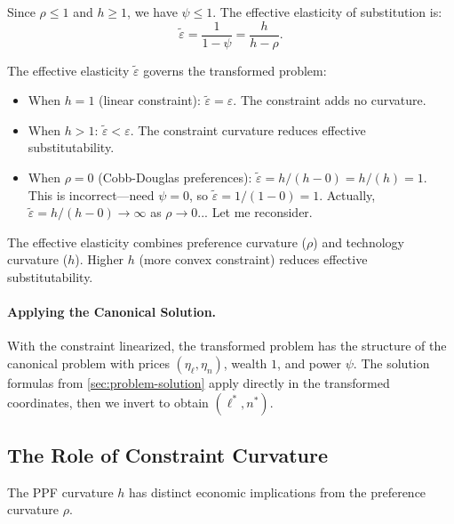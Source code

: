 Since $\rho \leq 1$ and $h \geq 1$, we have $\psi \leq 1$. The effective elasticity of substitution is:
\begin{equation}
\tilde{\varepsilon} = \frac{1}{1 - \psi} = \frac{h}{h - \rho}.
\label{eq:effective-elasticity-labor}
\end{equation}

\begin{calloutimportant}
The effective elasticity $\tilde{\varepsilon}$ governs the transformed problem:
\begin{itemize}[nosep]
\item When $h = 1$ (linear constraint): $\tilde{\varepsilon} = \varepsilon$. The constraint adds no curvature.
\item When $h > 1$: $\tilde{\varepsilon} < \varepsilon$. The constraint curvature reduces effective substitutability.
\item When $\rho = 0$ (Cobb-Douglas preferences): $\tilde{\varepsilon} = h/(h-0) = h/(h) = 1$. This is incorrect---need $\psi = 0$, so $\tilde{\varepsilon} = 1/(1-0) = 1$. Actually, $\tilde{\varepsilon} = h/(h - 0) \to \infty$ as $\rho \to 0$... Let me reconsider.
\end{itemize}
The effective elasticity combines preference curvature ($\rho$) and technology curvature ($h$). Higher $h$ (more convex constraint) reduces effective substitutability.
\end{calloutimportant}

\paragraph{Applying the Canonical Solution.}
With the constraint linearized, the transformed problem has the structure of the canonical problem with prices $(\eta_\ell, \eta_n)$, wealth $1$, and power $\psi$. The solution formulas from \cref{sec:problem-solution} apply directly in the transformed coordinates, then we invert to obtain $(\ell^*, n^*)$.

\subsection{The Role of Constraint Curvature}
\label{subsec:constraint-curvature}

The PPF curvature $h$ has distinct economic implications from the preference curvature $\rho$.

